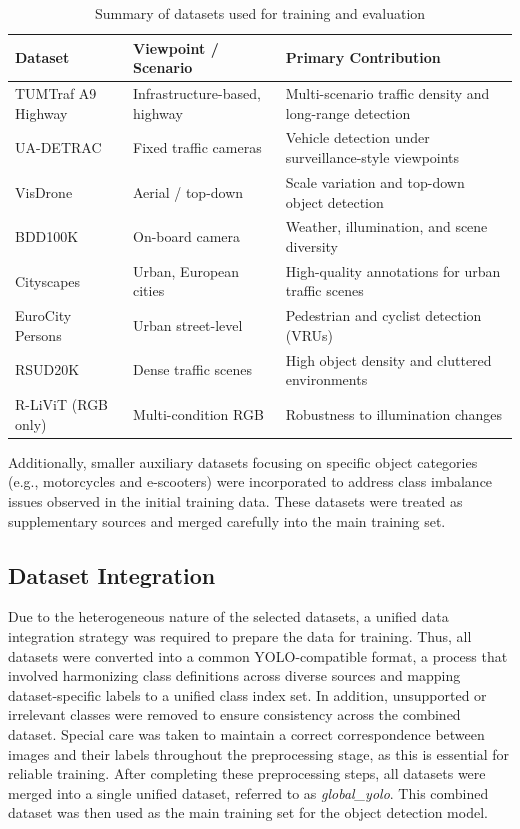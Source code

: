 \documentclass[12pt,a4paper]{report}
\begin{document}
\begin{table}[H]
\centering
\caption[Dataset Summary]{Summary of datasets used for training and evaluation}
\label{tab:datasets}
\begin{tabularx}{\textwidth}{l l >{\raggedright\arraybackslash}X}
\hline
\textbf{Dataset} & \textbf{Viewpoint / Scenario} & \textbf{Primary Contribution} \\
\hline
TUMTraf A9 Highway & Infrastructure-based, highway & Multi-scenario traffic density and long-range detection \\
UA-DETRAC & Fixed traffic cameras & Vehicle detection under surveillance-style viewpoints \\
VisDrone & Aerial / top-down & Scale variation and top-down object detection \\
BDD100K & On-board camera & Weather, illumination, and scene diversity \\
Cityscapes & Urban, European cities & High-quality annotations for urban traffic scenes \\
EuroCity Persons & Urban street-level & Pedestrian and cyclist detection (VRUs) \\
RSUD20K & Dense traffic scenes & High object density and cluttered environments \\
R-LiViT (RGB only) & Multi-condition RGB & Robustness to illumination changes \\
\hline
\end{tabularx}
\end{table}
Additionally, smaller auxiliary datasets focusing on specific object categories (e.g., motorcycles and e-scooters) were incorporated to address class imbalance issues observed in the initial training data. These datasets were treated as supplementary sources and merged carefully into the main training set.

\subsection{Dataset Integration}
Due to the heterogeneous nature of the selected datasets, a unified data integration strategy was required to prepare the data for training. Thus, all datasets were converted into a common YOLO-compatible format, a process that involved harmonizing class definitions across diverse sources and mapping dataset-specific labels to a unified class index set. In addition, unsupported or irrelevant classes were removed to ensure consistency across the combined dataset. Special care was taken to maintain a correct correspondence between images and their labels throughout the preprocessing stage, as this is essential for reliable training. After completing these preprocessing steps, all datasets were merged into a single unified dataset, referred to as \textit{global\_yolo}. This combined dataset was then used as the main training set for the object detection model.
\end{document}
